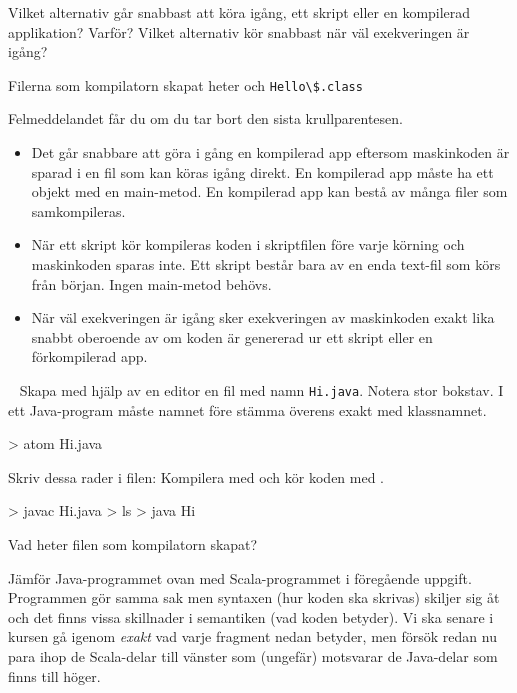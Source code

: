 \Subtask Vilket alternativ går snabbast att köra igång, ett skript eller en kompilerad applikation? Varför? Vilket alternativ kör snabbast när väl exekveringen är igång?


\SOLUTION


\TaskSolved \what


\SubtaskSolved  Filerna som kompilatorn skapat heter  och \verb+Hello\$.class+

\SubtaskSolved  Felmeddelandet får du om du tar bort den sista krullparentesen.

\SubtaskSolved

\begin{itemize}
  \item  Det går snabbare att göra i gång en kompilerad app eftersom maskinkoden är sparad i en fil som kan köras igång direkt. En kompilerad app måste ha ett objekt med en main-metod. En kompilerad app kan bestå av många filer som samkompileras.
  \item När ett skript kör kompileras koden i skriptfilen före varje körning och maskinkoden sparas inte. Ett skript består bara av en enda text-fil som körs från början. Ingen main-metod behövs.
  \item  När väl exekveringen är igång sker exekveringen av maskinkoden exakt lika snabbt oberoende av om koden är genererad ur ett skript eller en förkompilerad app.
\end{itemize}

\QUESTEND








\QUESTBEGIN

\Task \label{task:java} \what~   Skapa med hjälp av en editor en fil med namn \texttt{Hi.java}. Notera stor bokstav. I ett Java-program måste namnet före  stämma överens exakt med klassnamnet.
\begin{REPLnonum}
> atom Hi.java
\end{REPLnonum}
Skriv dessa rader i filen:
\noindent Kompilera med  och kör koden med .
\begin{REPLnonum}
> javac Hi.java
> ls
> java Hi
\end{REPLnonum}

\Subtask Vad heter filen som kompilatorn skapat?

\Subtask Jämför Java-programmet ovan med Scala-programmet i föregående uppgift. Programmen gör samma sak men syntaxen (hur koden ska skrivas) skiljer sig åt och det finns vissa skillnader i semantiken (vad koden betyder). Vi ska senare i kursen gå igenom \emph{exakt} vad varje fragment nedan betyder, men försök redan nu para ihop de Scala-delar till vänster som (ungefär) motsvarar de Java-delar som finns till höger.

